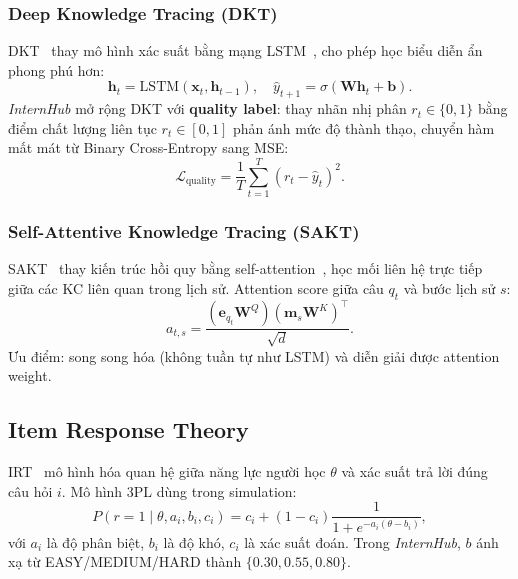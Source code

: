 \documentclass[conference]{IEEEtran}
\newcommand{\sys}{\textit{InternHub}}
\begin{document}
\subsubsection{Deep Knowledge Tracing (DKT)}
DKT~\cite{piech2015deep} thay mô hình xác suất bằng mạng LSTM~\cite{hochreiter1997long}, cho phép học biểu diễn ẩn phong phú hơn:
\begin{equation}
\mathbf{h}_t=\text{LSTM}(\mathbf{x}_t,\mathbf{h}_{t-1}),\quad \hat{y}_{t+1}=\sigma(\mathbf{W}\mathbf{h}_t+\mathbf{b}).
\end{equation}
\sys{} mở rộng DKT với \textbf{quality label}: thay nhãn nhị phân $r_t\in\{0,1\}$ bằng điểm chất lượng liên tục $r_t\in[0,1]$ phản ánh mức độ thành thạo, chuyển hàm mất mát từ Binary Cross-Entropy sang MSE:
\begin{equation}
\mathcal{L}_{\text{quality}}=\frac{1}{T}\sum_{t=1}^{T}(r_t-\hat{y}_t)^2.
\end{equation}

\subsubsection{Self-Attentive Knowledge Tracing (SAKT)}
SAKT~\cite{pandey2019self} thay kiến trúc hồi quy bằng self-attention~\cite{vaswani2017attention}, học mối liên hệ trực tiếp giữa các KC liên quan trong lịch sử. Attention score giữa câu $q_t$ và bước lịch sử $s$:
\begin{equation}
a_{t,s}=\frac{(\mathbf{e}_{q_t}\mathbf{W}^Q)(\mathbf{m}_s\mathbf{W}^K)^\top}{\sqrt{d}}.
\end{equation}
Ưu điểm: song song hóa (không tuần tự như LSTM) và diễn giải được attention weight.

\subsection{Item Response Theory}
IRT~\cite{embretson2000item,lord1980applications} mô hình hóa quan hệ giữa năng lực người học $\theta$ và xác suất trả lời đúng câu hỏi $i$. Mô hình 3PL dùng trong simulation:
\begin{equation}
P(r=1\mid\theta,a_i,b_i,c_i)=c_i+(1-c_i)\frac{1}{1+e^{-a_i(\theta-b_i)}},
\end{equation}
với $a_i$ là độ phân biệt, $b_i$ là độ khó, $c_i$ là xác suất đoán. Trong \sys{}, $b$ ánh xạ từ EASY/MEDIUM/HARD thành $\{0.30,0.55,0.80\}$.
\end{document}
